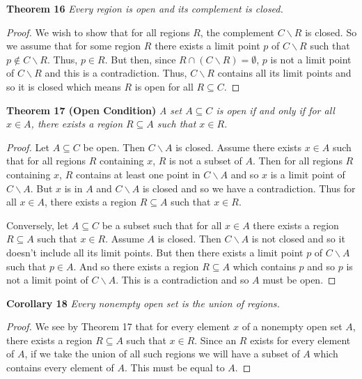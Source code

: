 \documentclass{article}
\begin{document}
\begin{flushleft}
\textbf{Theorem 16}
\textsl{Every region is open and its complement is closed.}
\begin{proof}
We wish to show that for all regions $R$, the complement $C \backslash R$ is closed. So we assume that for some region $R$ there exists a limit point $p$ of $C \backslash R$ such that $p \notin C \backslash R$. Thus, $p \in R$. But then, since $R \cap (C \backslash R) = \emptyset$, $p$ is not a limit point of $C \backslash R$ and this is a contradiction. Thus, $C \backslash R$ contains all its limit points and so it is closed which means $R$ is open for all $R \subseteq C$.
\end{proof}

\textbf{Theorem 17 (Open Condition)}
\textsl{A set $A \subseteq C$ is open if and only if for all $x \in A$, there exists a region $R \subseteq A$ such that $x \in R$.}
\begin{proof}
Let $A \subseteq C$ be open. Then $C \backslash A$ is closed. Assume there exists $x \in A$ such that for all regions $R$ containing $x$, $R$ is not a subset of $A$. Then for all regions $R$ containing $x$, $R$ contains at least one point in $C \backslash A$ and so $x$ is a limit point of $C \backslash A$. But $x$ is in $A$ and $C \backslash A$ is closed and so we have a contradiction. Thus for all $x \in A$, there exists a region $R \subseteq A$ such that $x \in R$.\newline

Conversely, let $A \subseteq C$ be a subset such that for all $x \in A$ there exists a region $R \subseteq A$ such that $x \in R$. Assume $A$ is closed. Then $C \backslash A$ is not closed and so it doesn't include all its limit points. But then there exists a limit point $p$ of $C \backslash A$ such that $p \in A$. And so there exists a region $R \subseteq A$ which contains $p$ and so $p$ is not a limit point of $C \backslash A$. This is a contradiction and so $A$ must be open.
\end{proof}

\textbf{Corollary 18}
\textsl{Every nonempty open set is the union of regions.}
\begin{proof}
We see by Theorem 17 that for every element $x$ of a nonempty open set $A$, there exists a region $R \subseteq A$ such that $x \in R$. Since an $R$ exists for every element of $A$, if we take the union of all such regions we will have a subset of $A$ which contains every element of $A$. This must be equal to $A$.
\end{proof}


\end{flushleft}
\end{document}
